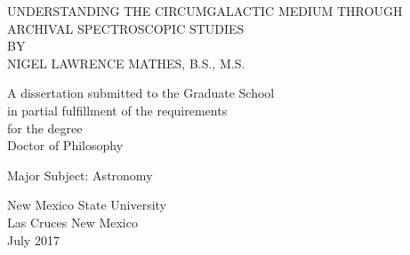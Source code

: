 \begin{center}
UNDERSTANDING THE CIRCUMGALACTIC MEDIUM THROUGH ARCHIVAL SPECTROSCOPIC STUDIES\\
\bigskip
BY\\
\bigskip
NIGEL LAWRENCE MATHES, B.S., M.S.
\end{center}
\vspace{1.0in}
\begin{center}
A dissertation submitted to the Graduate School\\
\bigskip
in partial fulfillment of the requirements\\
\bigskip
for the degree\\
\bigskip
Doctor of Philosophy
\end{center}
\bigskip
\begin{center}
Major Subject: Astronomy
\end{center}
\vspace{1.0in}
\begin{center}
New Mexico State University\\
\bigskip
Las Cruces New Mexico\\
\bigskip
July 2017
\end{center}
